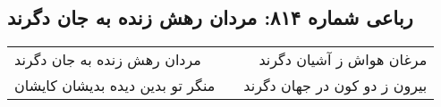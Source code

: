 \begin{center}
\section*{رباعی شماره ۸۱۴: مردان رهش زنده به جان دگرند}
\label{sec:0814}
\begin{longtable}{l p{0.5cm} r}
مردان رهش زنده به جان دگرند
&&
مرغان هواش ز آشیان دگرند
\\
منگر تو بدین دیده بدیشان کایشان
&&
بیرون ز دو کون در جهان دگرند
\\
\end{longtable}
\end{center}
